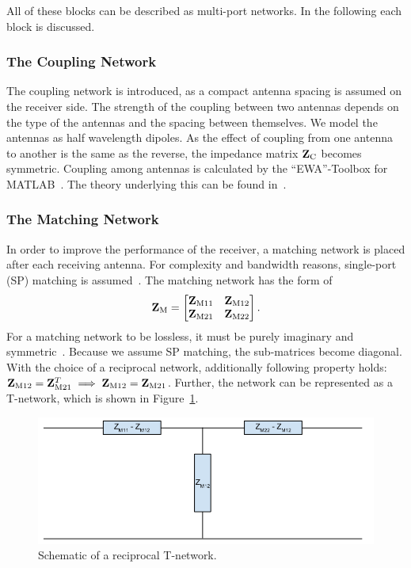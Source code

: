 All of these blocks can be described as multi-port networks.
In the following each block is discussed.

\subsubsection{The Coupling Network}
\label{sec:coupling_network}
The coupling network is introduced, as a compact antenna spacing is assumed on the receiver side.
The strength of the coupling between two antennas depends on the type of the antennas and the spacing between themselves.
We model the antennas as half wavelength dipoles.
As the effect of coupling from one antenna to another is the same as the reverse, the impedance matrix $\mathbf{Z}_\text{C}$ becomes symmetric.
Coupling among antennas is calculated by the ``EWA''-Toolbox for MATLAB~\cite{Orfanidis}.
The theory underlying this can be found in~\cite[Chapter 23]{Orfanidis}.

\subsubsection{The Matching Network}
\label{sec:matching_network}
In order to improve the performance of the receiver, a matching network is placed after each receiving antenna.
For complexity and bandwidth reasons, single-port (SP) matching is assumed~\cite{Yahia2013}.
The matching network has the form of 
\begin{equation}
\mathbf{Z}_\text{M}=
\begin{bmatrix}
\mathbf{Z}_\text{M11} & \mathbf{Z}_\text{M12} \\
\mathbf{Z}_\text{M21} & \mathbf{Z}_\text{M22}
\end{bmatrix}.
\end{equation}
For a matching network to be lossless, it must be purely imaginary and symmetric~\cite{Nossek}.
Because we assume SP matching, the sub-matrices become diagonal.
With the choice of a reciprocal network, additionally following property holds: $\mathbf{Z}_\text{M12} = \mathbf{Z}_\text{M21}^T \implies \mathbf{Z}_\text{M12} = \mathbf{Z}_\text{M21}$.
Further, the network can be represented as a T-network, which is shown in Figure~\ref{fig:t_netw}.
\begin{figure}[h]
\centering
  \includegraphics[width=0.7\linewidth]{images/T-Network.png}
\caption{Schematic of a reciprocal T-network.}
\label{fig:t_netw}
\end{figure}

